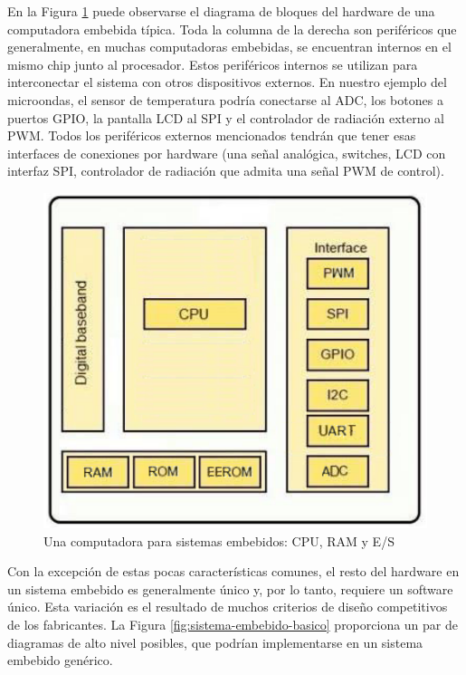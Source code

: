 \documentclass[output=paper, 
colorlinks,
citecolor=brown,
newtxmath
]{langscibook}
\begin{document}
En la Figura \ref{fig:hardware-basico} puede observarse el diagrama de bloques
del hardware de una computadora embebida típica.
Toda la columna de la derecha son periféricos que generalmente,
en muchas computadoras embebidas, se encuentran internos en el mismo chip
junto al procesador. Estos periféricos internos se utilizan 
para interconectar el sistema con otros dispositivos externos. En nuestro ejemplo
del microondas, el sensor de temperatura podría conectarse al ADC,
los botones a puertos GPIO, la pantalla LCD al SPI y el 
controlador de radiación externo al PWM.
Todos los periféricos externos mencionados tendrán que tener
esas interfaces de conexiones por hardware (una señal analógica,
switches, LCD con interfaz SPI, controlador de radiación
que admita una señal PWM de control).


\begin{figure}[h]
\includegraphics[scale=0.25]{images/hardware-basico2.png}
\caption{Una computadora para sistemas embebidos: CPU, RAM y E/S}
\label{fig:hardware-basico}
\end{figure}




Con la excepción de estas pocas características comunes, el resto del hardware en un sistema
embebido es generalmente único y, por lo tanto, requiere un software único. 
Esta variación es el resultado de muchos criterios de diseño competitivos de los fabricantes.
La Figura \ref{fig:sistema-embebido-basico} proporciona un par de diagramas de alto nivel 
posibles, que podrían implementarse en un sistema embebido genérico.
\end{document}
